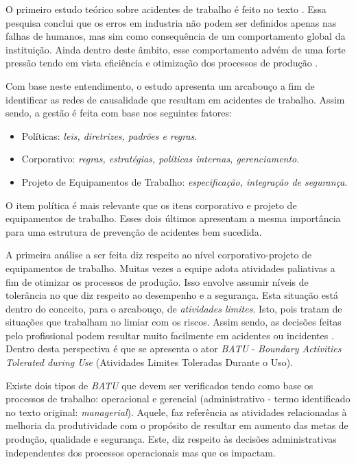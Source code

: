 O primeiro estudo teórico sobre acidentes de trabalho é feito no texto \cite{riskoldschool}. Essa pesquisa conclui que os erros em industria não podem ser definidos apenas nas falhas de humanos, mas sim como consequência de um comportamento global da instituição. Ainda dentro deste âmbito, esse comportamento advém de uma forte pressão tendo em vista eficiência e otimização dos processos de produção \cite{riskoldschool} \cite{safety}.

Com base neste entendimento, o estudo \cite{safety} apresenta um arcabouço a fim de identificar as redes de causalidade que resultam em acidentes de trabalho. Assim sendo, a gestão é feita com base nos seguintes fatores: 
\begin{itemize}
    \item Políticas: \textit{leis, diretrizes, padrões e regras}.
    \item Corporativo: \textit{regras, estratégias, políticas internas, gerenciamento}.
    \item Projeto de Equipamentos de Trabalho: \textit{especificação, integração de segurança}.
\end{itemize}

O item política é mais relevante que os itens corporativo e projeto de equipamentos de trabalho. Esses dois últimos apresentam a mesma importância para uma estrutura de prevenção de acidentes bem sucedida. 

A primeira análise a ser feita diz respeito ao nível corporativo-projeto de equipamentos de trabalho. Muitas vezes a equipe adota atividades paliativas a fim de otimizar os processos de produção. Isso envolve assumir níveis de tolerância no que diz respeito ao desempenho e a segurança. Esta situação está dentro do conceito, para o arcabouço, de \textit{atividades limites}. Isto, pois tratam de situações que trabalham no limiar com os riscos. Assim sendo, as decisões feitas pelo profissional podem resultar muito facilmente em acidentes ou incidentes \cite{safety}. Dentro desta perspectiva é que se apresenta o ator \textit{BATU} - \textit{Boundary Activities Tolerated during Use} (Atividades Limites Toleradas Durante o Uso).

Existe dois tipos de \textit{BATU} que devem ser verificados tendo como base os processos de trabalho: operacional e gerencial (administrativo - termo identificado no texto original: \textit{managerial}). Aquele, faz referência as atividades relacionadas à melhoria da produtividade com o propósito de resultar em aumento das metas de produção, qualidade e segurança. Este, diz respeito às decisões administrativas independentes dos processos operacionais mas que os impactam.

